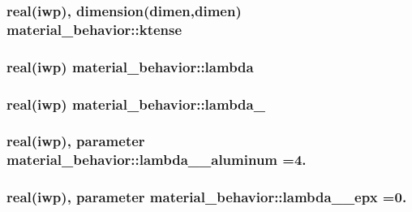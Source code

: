 \subsubsection[{ktense}]{\setlength{\rightskip}{0pt plus 5cm}real(iwp), dimension(dimen,dimen) material\+\_\+behavior\+::ktense}\label{classmaterial__behavior_ad71dfe377781d970157d3ff0d60053b3}
\hypertarget{classmaterial__behavior_a29961cc059e7a441ade63d17635929e3}{}
\subsubsection[{lambda}]{\setlength{\rightskip}{0pt plus 5cm}real(iwp) material\+\_\+behavior\+::lambda}\label{classmaterial__behavior_a29961cc059e7a441ade63d17635929e3}
\hypertarget{classmaterial__behavior_a14638f0398619753351d332fbcfa685e}{}
\subsubsection[{lambda\+\_\+01}]{\setlength{\rightskip}{0pt plus 5cm}real(iwp) material\+\_\+behavior\+::lambda\+\_}\label{classmaterial__behavior_a14638f0398619753351d332fbcfa685e}
\hypertarget{classmaterial__behavior_ab44dd2aa265378e895e462fde60b65c5}{}
\subsubsection[{lambda\+\_\+01\+\_\+aluminum}]{\setlength{\rightskip}{0pt plus 5cm}real(iwp), parameter material\+\_\+behavior\+::lambda\+\_\+\_\+aluminum =4.}\label{classmaterial__behavior_ab44dd2aa265378e895e462fde60b65c5}
\hypertarget{classmaterial__behavior_a3884ad39ef0fb43d355789acc29c8c1a}{}
\subsubsection[{lambda\+\_\+01\+\_\+epx}]{\setlength{\rightskip}{0pt plus 5cm}real(iwp), parameter material\+\_\+behavior\+::lambda\+\_\+\_\+epx =0.}\label{classmaterial__behavior_a3884ad39ef0fb43d355789acc29c8c1a}
\hypertarget{classmaterial__behavior_a211dd81ae27709e6027a897a00bc94f8}{}
